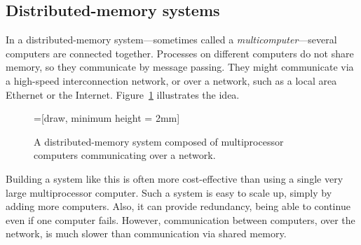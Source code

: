 
\subsection{Distributed-memory systems}

In a distributed-memory system---sometimes called a
\emph{multicomputer}---several computers are connected together.  Processes on
different computers do not share memory, so they communicate by message
passing.  They might communicate via a high-speed interconnection network, or
over a network, such as a local area Ethernet or the Internet.
Figure~\ref{fig:distributed} illustrates the idea.


\begin{figure}
\begin{center}
=[draw, minimum height = 2mm]
\end{center}
\caption{A distributed-memory system composed of multiprocessor computers
  communicating over a network.}
\label{fig:distributed}
\end{figure}


Building a system like this is often more cost-effective than using a single
very large multiprocessor computer.  Such a system is easy to scale up, simply
by adding more computers.  Also, it can provide redundancy, being able to
continue even if one computer fails.  However, communication between
computers, over the network, is much slower than communication via shared
memory.

